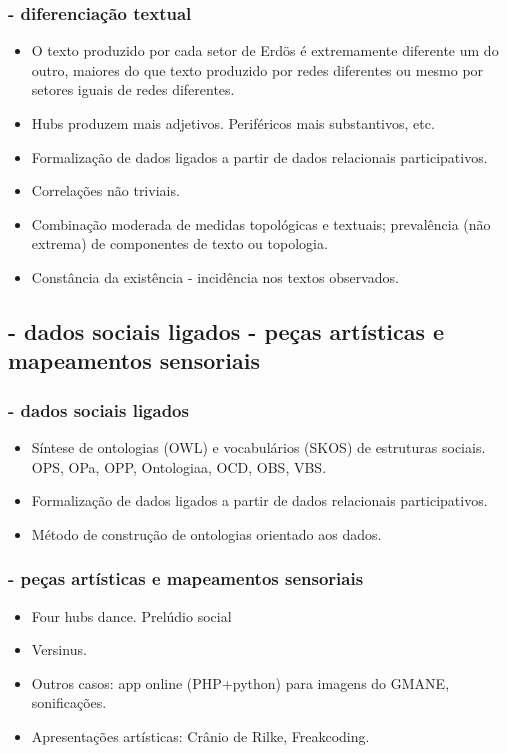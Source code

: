 \documentclass[10pt]{beamer}
\begin{document}
\begin{frame}
\frametitle{- diferenciação textual}
\begin{itemize}
	\item O texto produzido por cada setor de Erdös é extremamente diferente um do outro, maiores do que texto produzido por redes diferentes ou mesmo por setores iguais de redes diferentes.
	\item Hubs produzem mais adjetivos. Periféricos mais substantivos, etc.
	\item Formalização de dados ligados a partir de dados relacionais participativos.
	\item Correlações não triviais.
	\item Combinação moderada de medidas topológicas e textuais; prevalência (não extrema) de componentes de texto ou topologia.
	\item Constância da existência - incidência nos textos observados.
\end{itemize}
\end{frame}

\begin{frame}
\subsection{- dados sociais ligados \;\; - peças artísticas e mapeamentos sensoriais}
\frametitle{- dados sociais ligados}
\begin{itemize}
	\item Síntese de ontologias (OWL) e vocabulários (SKOS) de estruturas sociais. OPS, OPa, OPP, Ontologiaa, OCD, OBS, VBS.
	\item Formalização de dados ligados a partir de dados relacionais participativos.
	\item Método de construção de ontologias orientado aos dados.
\end{itemize}
\end{frame}

\begin{frame}
\frametitle{- peças artísticas e mapeamentos sensoriais}
\begin{itemize}
	\item Four hubs dance. Prelúdio social
	\item Versinus.
	\item Outros casos: app online (PHP+python) para imagens do GMANE, sonificações.
	\item Apresentações artísticas: Crânio de Rilke, Freakcoding.
\end{itemize}
\end{frame}
\end{document}
